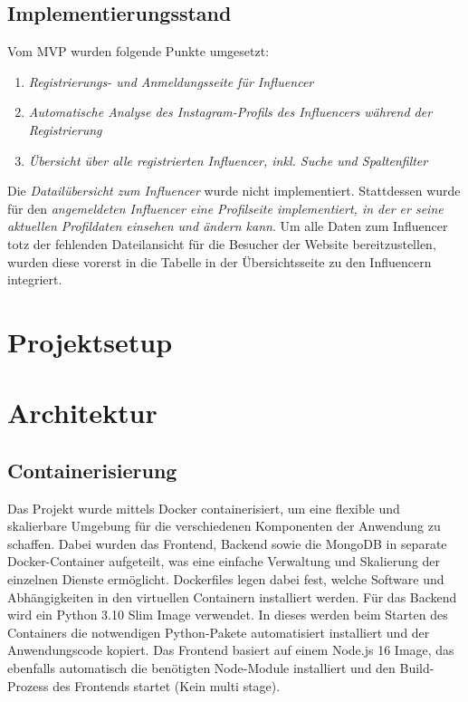 \documentclass[conference,a4paper,flushend]{cs-techrep}
\begin{document}
\subsection{Implementierungsstand}
Vom MVP wurden folgende Punkte umgesetzt:
\begin{enumerate}
\item{\textit{Registrierungs- und Anmeldungsseite für Influencer}}
\item{\textit{Automatische Analyse des Instagram-Profils des Influencers während der Registrierung}}
\item{\textit{Übersicht über alle registrierten Influencer, inkl. Suche und Spaltenfilter}}
\end{enumerate}

Die \textit{Datailübersicht zum Influencer} wurde nicht implementiert. Stattdessen wurde für den \textit{angemeldeten Influencer eine Profilseite implementiert, in der er seine aktuellen Profildaten einsehen und ändern kann}. Um alle Daten zum Influencer totz der fehlenden Dateilansicht für die Besucher der Website bereitzustellen, wurden diese vorerst in die Tabelle in der Übersichtsseite zu den Influencern integriert. \\



\section{Projektsetup}



\section{Architektur}

\subsection{Containerisierung}
Das Projekt wurde mittels Docker containerisiert, um eine flexible und skalierbare Umgebung für die verschiedenen Komponenten der Anwendung zu schaffen.
Dabei wurden das Frontend, Backend sowie die MongoDB in separate Docker-Container aufgeteilt, was eine einfache Verwaltung und Skalierung der einzelnen Dienste ermöglicht. Dockerfiles legen dabei fest, welche Software und Abhängigkeiten in den virtuellen Containern installiert werden. Für das Backend wird ein Python 3.10 Slim Image verwendet. In dieses werden beim Starten des Containers die notwendigen Python-Pakete automatisiert installiert und der Anwendungscode kopiert. Das Frontend basiert auf einem Node.js 16 Image, das ebenfalls automatisch die benötigten Node-Module installiert und den Build-Prozess des Frontends startet (Kein multi stage).
\end{document}
